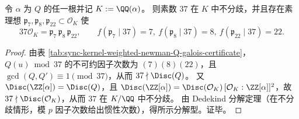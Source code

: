 \begin{proposition}\label{prop:sync-kernel-weighted-newman-Q-splitting-p37}
令 \(\alpha\) 为 \(Q\) 的任一根并记 \(K:=\QQ(\alpha)\)。
则素数 \(37\) 在 \(K\) 中不分歧，并且存在素理想 \(\mathfrak p_7,\mathfrak p_8,\mathfrak p_{22}\subset\mathcal O_K\) 使
\[
37\mathcal O_K=\mathfrak p_7\,\mathfrak p_8\,\mathfrak p_{22},
\qquad
f(\mathfrak p_7\mid 37)=7,\ 
f(\mathfrak p_8\mid 37)=8,\ 
f(\mathfrak p_{22}\mid 37)=22.
\]
\end{proposition}
\begin{proof}
由表 \ref{tab:sync-kernel-weighted-newman-Q-galois-certificate}，\(Q(u)\bmod 37\) 的不可约因子次数为 \((7)(8)(22)\)，且 \(\gcd(Q,Q')\equiv 1\pmod{37}\)，从而 \(37\nmid \Disc(Q)\)。
又 \(\Disc(\ZZ[\alpha])=\Disc(Q)\)，且 \(\Disc(\ZZ[\alpha])=\Disc(\mathcal O_K)\,[\mathcal O_K:\ZZ[\alpha]]^2\)，故 \(37\nmid \Disc(\mathcal O_K)\)，从而 \(37\) 在 \(K/\QQ\) 中不分歧。
由 Dedekind 分解定理（在不分歧情形，模 \(p\) 因子次数给出惯性次数），得所示分解型。证毕。
\end{proof}


